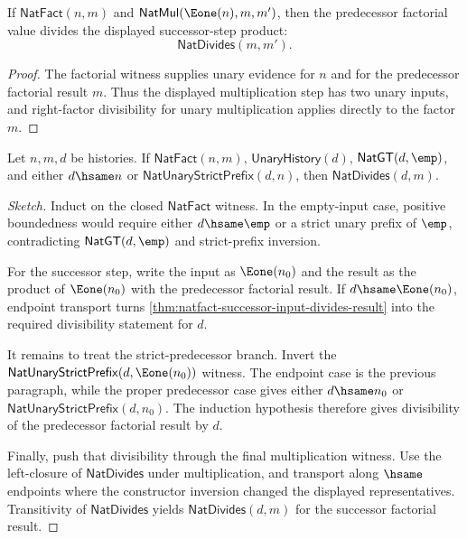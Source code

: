 \begin{theorem}
\label{thm:natfact-successor-step-predecessor-divides}
If \(\mathsf{NatFact}(n,m)\) and
\(\mathsf{NatMul}(\Eone(n),m,m')\), then the predecessor factorial value
divides the displayed successor-step product:
$$
\mathsf{NatDivides}(m,m').
$$
\end{theorem}
\begin{proof}
The factorial witness supplies unary evidence for \(n\) and for the
predecessor factorial result \(m\). Thus the displayed multiplication step has
two unary inputs, and right-factor divisibility for unary multiplication
applies directly to the factor \(m\).
\end{proof}

\begin{theorem}
\label{thm:natfact-bounded-positive-predecessor-divides}
Let $n,m,d$ be histories. If $\mathsf{NatFact}(n,m)$,
$\mathsf{UnaryHistory}(d)$, $\mathsf{NatGT}(d,\emp)$, and either $d\hsame n$
or $\mathsf{NatUnaryStrictPrefix}(d,n)$, then
$\mathsf{NatDivides}(d,m)$.
\end{theorem}
\begin{proof}[Sketch]
Induct on the closed $\mathsf{NatFact}$ witness. In the empty-input case,
positive boundedness would require either $d\hsame\emp$ or a strict unary
prefix of $\emp$, contradicting $\mathsf{NatGT}(d,\emp)$ and strict-prefix
inversion.

For the successor step, write the input as $\Eone(n_0)$ and the result as the
product of $\Eone(n_0)$ with the predecessor factorial result. If
$d\hsame\Eone(n_0)$, endpoint transport turns
\autoref{thm:natfact-successor-input-divides-result} into the required
divisibility statement for $d$.

It remains to treat the strict-predecessor branch. Invert the
$\mathsf{NatUnaryStrictPrefix}(d,\Eone(n_0))$ witness. The endpoint case is the
previous paragraph, while the proper predecessor case gives either
$d\hsame n_0$ or $\mathsf{NatUnaryStrictPrefix}(d,n_0)$. The induction
hypothesis therefore gives divisibility of the predecessor factorial result by
$d$.

Finally, push that divisibility through the final multiplication witness. Use
the left-closure of $\mathsf{NatDivides}$ under multiplication, and transport
along $\hsame$ endpoints where the constructor inversion changed the displayed
representatives. Transitivity of $\mathsf{NatDivides}$ yields
$\mathsf{NatDivides}(d,m)$ for the successor factorial result.
\end{proof}

